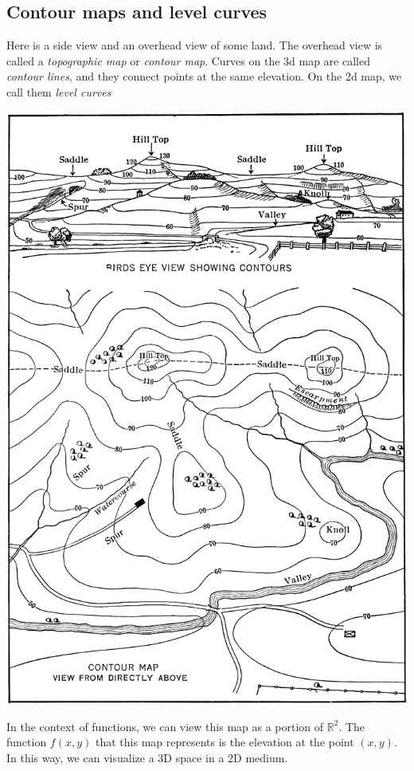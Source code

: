 \pagebreak 

\subsection{Contour maps and level curves}
Here is a side view and an overhead view of some land. The overhead view is called a \emph{topographic map} or \emph{contour map}. Curves on the 3d map are called \emph{contour lines}, and they connect points at the same elevation. On the 2d map, we call them \emph{level curves}
\begin{center}
    \includegraphics[width=.7\textwidth]{images/contour-map}\label{img:fcit-page-1}
\end{center}

In the context of functions, we can view this map as a portion of $\mathbb{R}^2$. The function $f(x,y)$ that this map represents is the elevation at the point $(x,y)$. In this way, we can visualize a 3D space in a 2D medium.
\vfill\mbox{} 
\pagebreak 

